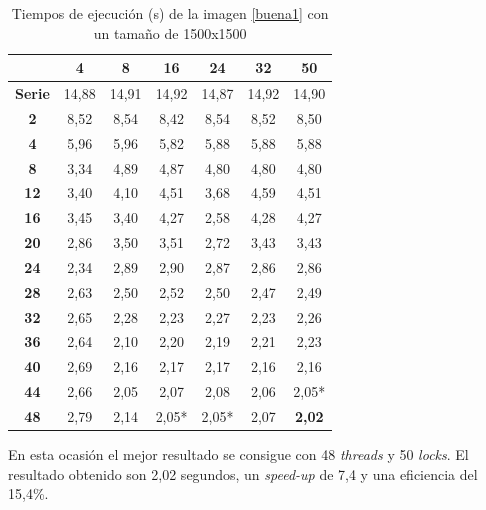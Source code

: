 \begin{table}[H]
	\centering
	\small
	\begin{tabular}{|c|c|c|c|c|c|c|}
		\hline
		{\bf \backslashbox{Threads}{Locks}}   & {\bf 4} & {\bf 8} & {\bf 16} & {\bf 24} & {\bf 32} & {\bf 50} \\ \hline
		{\bf Serie}  & 14,88   & 14,91   & 14,92    & 14,87    & 14,92    & 14,90    \\ \hline
		{\bf 2}  & 8,52    & 8,54    & 8,42     & 8,54     & 8,52     & 8,50     \\ \hline
		{\bf 4}  & 5,96    & 5,96    & 5,82     & 5,88     & 5,88     & 5,88     \\ \hline
		{\bf 8}  & 3,34    & 4,89    & 4,87     & 4,80     & 4,80     & 4,80     \\ \hline
		{\bf 12} & 3,40    & 4,10    & 4,51     & 3,68     & 4,59     & 4,51     \\ \hline
		{\bf 16} & 3,45    & 3,40    & 4,27     & 2,58     & 4,28     & 4,27     \\ \hline
		{\bf 20} & 2,86    & 3,50    & 3,51     & 2,72     & 3,43     & 3,43     \\ \hline
		{\bf 24} & 2,34    & 2,89    & 2,90     & 2,87     & 2,86     & 2,86     \\ \hline
		{\bf 28} & 2,63    & 2,50    & 2,52     & 2,50     & 2,47     & 2,49     \\ \hline
		{\bf 32} & 2,65    & 2,28    & 2,23     & 2,27     & 2,23     & 2,26     \\ \hline
		{\bf 36} & 2,64    & 2,10    & 2,20     & 2,19     & 2,21     & 2,23     \\ \hline
		{\bf 40} & 2,69    & 2,16    & 2,17     & 2,17     & 2,16     & 2,16     \\ \hline
		{\bf 44} & 2,66    & 2,05    & 2,07     & 2,08     & 2,06     & 2,05*     \\ \hline
		{\bf 48} & 2,79    & 2,14    & 2,05*     & 2,05*     & 2,07     & \textbf{2,02}     \\ \hline
	\end{tabular}
	\captionsetup{justification=centering}	
	\caption{Tiempos de ejecuci\'{o}n (s) de la imagen \ref{buena1} con un tama\~{n}o de 1500x1500}
	\label{img1-1500}
\end{table}

En esta ocasi\'{o}n el mejor resultado se consigue con 48 \textit{threads} y 50 \textit{locks}. El resultado obtenido son 2,02 segundos,  un \textit{speed-up} de 7,4 y una eficiencia del 15,4\%.


